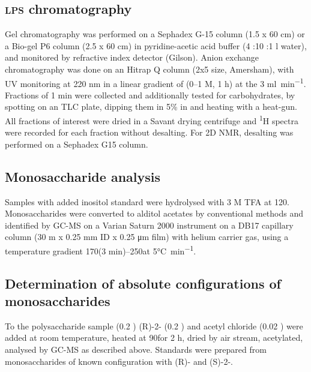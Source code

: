 \subsection{\textsc{lps} chromatography} %
\label{sub:chromatography}

Gel chromatography was performed on a Sephadex G-15 column (1.5 x 60 \si{\centi\meter}) or a
Bio-gel P6 column (2.5 x 60 \si{\centi\meter}) in pyridine-acetic acid buffer (4 \millilitre:10
\millilitre:1 \si{\litre} water), and monitored by refractive index detector (Gilson). Anion
exchange chromatography was done on an Hitrap Q column (2x5 \millilitre size, Amersham), with
\ac{UV} monitoring at 220 nm in a linear gradient of  (0--1 M, 1 h) at the 3
\si{\milli\litre\per\minute}. Fractions of 1 min were collected and additionally tested for
carbohydrates, by spotting on an  \ac{TLC} plate, dipping them in 5\%  in
 and heating with a heat-gun. All fractions of interest were dried in a Savant drying
centrifuge and \textsuperscript{1}H spectra were recorded for each fraction without desalting. For
2D \ac{NMR}, desalting was performed on a Sephadex G15 column.

\subsection{Monosaccharide analysis} %
\label{sub:monosaccharide_analysis}

Samples with added inositol standard were hydrolysed with 3 M \ac{TFA} at 120\cel. Monosaccharides
were converted to alditol acetates by conventional methods and identified by \ac{GC-MS} on a
Varian Saturn 2000 instrument on a DB17 capillary column (30 m x 0.25 \si{\milli\meter} ID x 0.25
\si{\micro\meter} film) with helium carrier gas, using a temperature gradient 170\cel (3
min)--250\cel at 5\si{\degreeCelsius\per\minute}.

\subsection{Determination of absolute configurations of monosaccharides} %
\label{sub:determination_of_absolute_configurations_of_monosaccharides}

To the polysaccharide sample (0.2 \milligram) (R)-2- (0.2 \millilitre) and acetyl
chloride (0.02 \millilitre) were added at room temperature, heated at 90\cel for 2 h, dried by air
stream, acetylated, analysed by \ac{GC-MS} as described above. Standards were prepared from
monosaccharides of known configuration with (R)- and (S)-2-.

